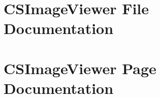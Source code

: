\documentclass[a4paper]{book}
\begin{document}
\chapter{CSImage\-Viewer File Documentation}







\chapter{CSImage\-Viewer Page Documentation}

\printindex
\end{document}
